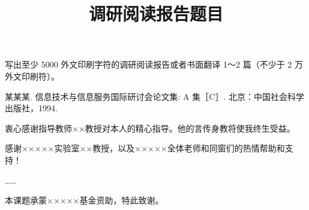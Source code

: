 \documentclass[degree=bachelor]{thuthesis}
\begin{document}
\appendix
\begin{translation}

\title{调研阅读报告题目}
\maketitle

写出至少 5000 外文印刷字符的调研阅读报告或者书面翻译 1～2 篇（不少于 2 万外文印刷符）。

\vspace{20bp}%

\begin{thebibliography}{1}
某某某.
\newblock 信息技术与信息服务国际研讨会论文集: A 集［C］.
\newblock 北京：中国社会科学出版社，1994.
\end{thebibliography}

\end{translation}


\backmatter

\begin{acknowledgements}
  衷心感谢指导教师××教授对本人的精心指导。他的言传身教将使我终生受益。

  感谢×××××实验室××教授，以及×××××全体老师和同窗们的热情帮助和支持！

  ……

  本课题承蒙×××××基金资助，特此致谢。
\end{acknowledgements}


\statement
\end{document}
